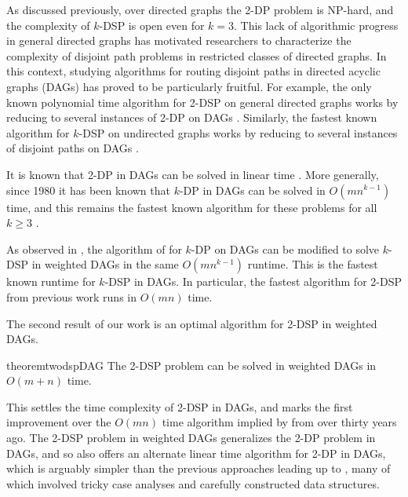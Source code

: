 \documentclass[11pt]{article}
\newcommand{\NP}{\textsf{NP}\xspace}
\theoremstyle{definition}
\newcommand\nicole[1]{\textcolor{red}{Nicole says: #1}}
\begin{document}
As discussed previously, over  directed graphs the  \textsf{2-DP} problem is \NP-hard, and the complexity of \textsf{$k$-DSP}  is open even for $k=3$.
This lack of algorithmic progress in general directed graphs has motivated researchers to characterize the complexity of disjoint path problems in restricted classes of directed graphs.
In this context, studying algorithms for routing disjoint paths in directed acyclic graphs (DAGs) has proved to be particularly fruitful.
For example, the only known polynomial time algorithm for \textsf{2-DSP} on general directed graphs works by reducing to several instances of \textsf{2-DP} on DAGs \cite{BercziKobayashi2017}.
Similarly, the fastest known algorithm for \textsf{$k$-DSP} on undirected graphs works by reducing to several instances of disjoint paths on DAGs \cite{Geometric-Lens-conf}.

It is known that \textsf{2-DP} in DAGs can be solved in linear time \cite{Tholey12}.
More generally, since 1980 it has been known that \textsf{$k$-DP} in DAGs can be solved in $O(mn^{k-1})$ time, and this remains the fastest known algorithm for these problems for all $k\ge 3$ \cite[Theorem 3]{FortuneHopcroftWyllie1980}.

As observed in \cite[Proposition 10]{BercziKobayashi2017}, the algorithm of \cite{FortuneHopcroftWyllie1980} for \textsf{$k$-DP} on DAGs can be  modified to solve \textsf{$k$-DSP} in weighted DAGs in the same $O(mn^{k-1})$ runtime.
This is the fastest known runtime for \textsf{$k$-DSP} in DAGs.
In particular, the fastest algorithm for \textsf{2-DSP} from previous work runs in $O(mn)$ time.


The second result of our work is an optimal algorithm for \textsf{2-DSP} in weighted DAGs.

\begin{restatable}{theorem}{twodspDAG}
    \label{2dsp-DAG}
    The \textsf{2-DSP} problem can be solved in weighted DAGs in $O(m+n)$ time.
\end{restatable}

This settles the  time complexity of \textsf{2-DSP} in DAGs, and marks the first improvement over the $O(mn)$ time algorithm implied by \cite{FortuneHopcroftWyllie1980} from over thirty years ago.
The \textsf{2-DSP} problem in weighted DAGs generalizes the \textsf{2-DP} problem in DAGs, and so  also offers an alternate linear time algorithm for \textsf{2-DP} in DAGs, which is arguably simpler than the previous approaches leading up to \cite{Tholey12}, many of which involved  tricky case analyses and carefully constructed data structures.
\end{document}
